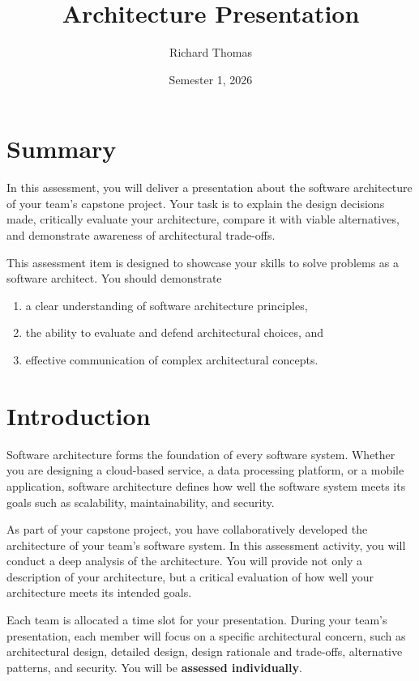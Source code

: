 \documentclass{csse4400}
\title{Architecture Presentation}
\author{Richard Thomas}
\date{Semester 1, 2026}
\begin{document}

\maketitle

\section*{Summary}

In this assessment, you will deliver a presentation about the software architecture of your team's capstone project.
Your task is to explain the design decisions made, critically evaluate your architecture,
compare it with viable alternatives, and demonstrate awareness of architectural trade-offs.

This assessment item is designed to showcase your skills to solve problems as a software architect. You should demonstrate
\begin{enumerate}[topsep=4pt,partopsep=1pt,itemsep=2pt,parsep=2pt]
    \item a clear understanding of software architecture principles,
    \item the ability to evaluate and defend architectural choices, and
    \item effective communication of complex architectural concepts.
\end{enumerate}


\section{Introduction}

Software architecture forms the foundation of every software system. Whether you are designing a cloud-based service, a data processing platform, or a mobile application, software architecture defines how well the software system meets its goals such as scalability, maintainability, and security.

As part of your capstone project, you have collaboratively developed the architecture of your team's software system.
In this assessment activity, you will conduct a deep analysis of the architecture.
You will provide not only a description of your architecture, but a critical evaluation of how well your architecture meets its intended goals.

Each team is allocated a time slot for your presentation.
During your team's presentation, each member will focus on a specific architectural concern,
such as architectural design, detailed design, design rationale and trade-offs, alternative patterns, and security.
You will be \textbf{assessed individually}.
\end{document}
